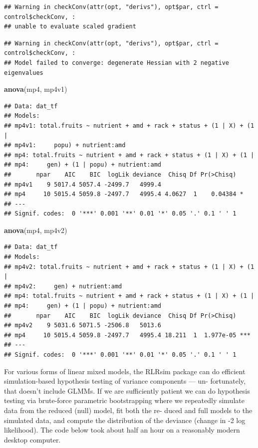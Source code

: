 \documentclass[
  12pt,
]{book}
\newenvironment{Shaded}{\begin{snugshade}}{\end{snugshade}}
\newcommand{\KeywordTok}[1]{\textcolor[rgb]{0.13,0.29,0.53}{\textbf{#1}}}
\newcommand{\NormalTok}[1]{#1}
\begin{document}
\begin{verbatim}
## Warning in checkConv(attr(opt, "derivs"), opt$par, ctrl = control$checkConv, :
## unable to evaluate scaled gradient
\end{verbatim}

\begin{verbatim}
## Warning in checkConv(attr(opt, "derivs"), opt$par, ctrl = control$checkConv, :
## Model failed to converge: degenerate Hessian with 2 negative eigenvalues
\end{verbatim}

\begin{Shaded}
\begin{Highlighting}[]
\KeywordTok{anova}\NormalTok{(mp4, mp4v1)}
\end{Highlighting}
\end{Shaded}

\begin{verbatim}
## Data: dat_tf
## Models:
## mp4v1: total.fruits ~ nutrient + amd + rack + status + (1 | X) + (1 | 
## mp4v1:     popu) + nutrient:amd
## mp4: total.fruits ~ nutrient + amd + rack + status + (1 | X) + (1 | 
## mp4:     gen) + (1 | popu) + nutrient:amd
##       npar    AIC    BIC  logLik deviance  Chisq Df Pr(>Chisq)  
## mp4v1    9 5017.4 5057.4 -2499.7   4999.4                       
## mp4     10 5015.4 5059.8 -2497.7   4995.4 4.0627  1    0.04384 *
## ---
## Signif. codes:  0 '***' 0.001 '**' 0.01 '*' 0.05 '.' 0.1 ' ' 1
\end{verbatim}

\begin{Shaded}
\begin{Highlighting}[]
\KeywordTok{anova}\NormalTok{(mp4, mp4v2)}
\end{Highlighting}
\end{Shaded}

\begin{verbatim}
## Data: dat_tf
## Models:
## mp4v2: total.fruits ~ nutrient + amd + rack + status + (1 | X) + (1 | 
## mp4v2:     gen) + nutrient:amd
## mp4: total.fruits ~ nutrient + amd + rack + status + (1 | X) + (1 | 
## mp4:     gen) + (1 | popu) + nutrient:amd
##       npar    AIC    BIC  logLik deviance  Chisq Df Pr(>Chisq)    
## mp4v2    9 5031.6 5071.5 -2506.8   5013.6                         
## mp4     10 5015.4 5059.8 -2497.7   4995.4 18.211  1  1.977e-05 ***
## ---
## Signif. codes:  0 '***' 0.001 '**' 0.01 '*' 0.05 '.' 0.1 ' ' 1
\end{verbatim}

For various forms of linear mixed models, the RLRsim package can do efficient simulation-based hypothesis testing of variance components --- un- fortunately, that doesn't include GLMMs.
If we are sufficiently patient we can do hypothesis testing via brute-force parametric bootstrapping where we repeatedly simulate data from the reduced (null) model, fit both the re- duced and full models to the simulated data, and compute the distribution of the deviance (change in -2 log likelihood).
The code below took about half an hour on a reasonably modern desktop computer.
\end{document}
